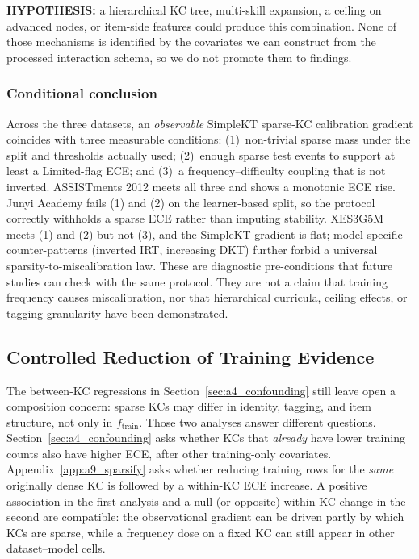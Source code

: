 \textbf{HYPOTHESIS:} a hierarchical KC tree, multi-skill expansion, a ceiling on advanced nodes, or item-side features could produce this combination.
None of those mechanisms is identified by the covariates we can construct from the processed interaction schema, so we do not promote them to findings.

\subsubsection*{Conditional conclusion}
Across the three datasets, an \emph{observable} SimpleKT sparse-KC calibration gradient coincides with three measurable conditions: (1)~non-trivial sparse mass under the split and thresholds actually used; (2)~enough sparse test events to support at least a Limited-flag ECE; and (3)~a frequency--difficulty coupling that is not inverted.
ASSISTments 2012 meets all three and shows a monotonic ECE rise.
Junyi Academy fails (1) and (2) on the learner-based split, so the protocol correctly withholds a sparse ECE rather than imputing stability.
XES3G5M meets (1) and (2) but not (3), and the SimpleKT gradient is flat; model-specific counter-patterns (inverted IRT, increasing DKT) further forbid a universal sparsity-to-miscalibration law.
These are diagnostic pre-conditions that future studies can check with the same protocol.
They are not a claim that training frequency causes miscalibration, nor that hierarchical curricula, ceiling effects, or tagging granularity have been demonstrated.

\subsection{Controlled Reduction of Training Evidence}
\label{sec:a9_sparsify}
The between-KC regressions in Section~\ref{sec:a4_confounding} still leave open a composition concern: sparse KCs may differ in identity, tagging, and item structure, not only in $f_{\mathrm{train}}$.
Those two analyses answer different questions. Section~\ref{sec:a4_confounding} asks whether KCs that \emph{already} have lower training counts also have higher ECE, after other training-only covariates. Appendix~\ref{app:a9_sparsify} asks whether reducing training rows for the \emph{same} originally dense KC is followed by a within-KC ECE increase. A positive association in the first analysis and a null (or opposite) within-KC change in the second are compatible: the observational gradient can be driven partly by which KCs are sparse, while a frequency dose on a fixed KC can still appear in other dataset--model cells.

